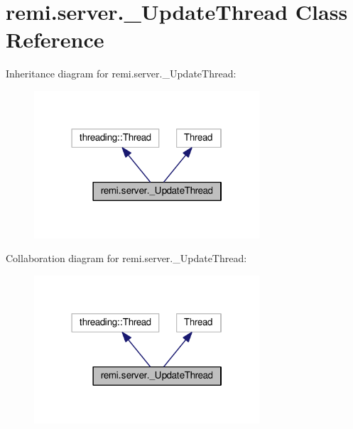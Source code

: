 \hypertarget{classremi_1_1server_1_1__UpdateThread}{}\section{remi.\+server.\+\_\+\+Update\+Thread Class Reference}
\label{classremi_1_1server_1_1__UpdateThread}


Inheritance diagram for remi.\+server.\+\_\+\+Update\+Thread\+:
\nopagebreak
\begin{figure}[H]
\begin{center}
\leavevmode
\includegraphics[width=238pt]{d5/d64/classremi_1_1server_1_1__UpdateThread__inherit__graph}
\end{center}
\end{figure}


Collaboration diagram for remi.\+server.\+\_\+\+Update\+Thread\+:
\nopagebreak
\begin{figure}[H]
\begin{center}
\leavevmode
\includegraphics[width=238pt]{d3/d9a/classremi_1_1server_1_1__UpdateThread__coll__graph}
\end{center}
\end{figure}
